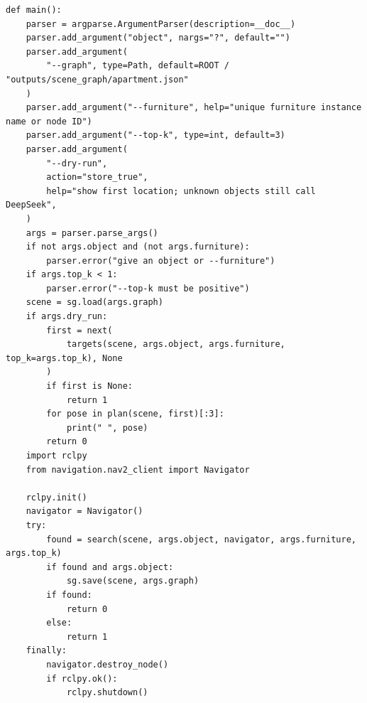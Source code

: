 \documentclass[11pt,a4paper]{book}
\begin{document}
\begin{lstlisting}[firstnumber=110]
def main():
    parser = argparse.ArgumentParser(description=__doc__)
    parser.add_argument("object", nargs="?", default="")
    parser.add_argument(
        "--graph", type=Path, default=ROOT / "outputs/scene_graph/apartment.json"
    )
    parser.add_argument("--furniture", help="unique furniture instance name or node ID")
    parser.add_argument("--top-k", type=int, default=3)
    parser.add_argument(
        "--dry-run",
        action="store_true",
        help="show first location; unknown objects still call DeepSeek",
    )
    args = parser.parse_args()
    if not args.object and (not args.furniture):
        parser.error("give an object or --furniture")
    if args.top_k < 1:
        parser.error("--top-k must be positive")
    scene = sg.load(args.graph)
    if args.dry_run:
        first = next(
            targets(scene, args.object, args.furniture, top_k=args.top_k), None
        )
        if first is None:
            return 1
        for pose in plan(scene, first)[:3]:
            print(" ", pose)
        return 0
    import rclpy
    from navigation.nav2_client import Navigator

    rclpy.init()
    navigator = Navigator()
    try:
        found = search(scene, args.object, navigator, args.furniture, args.top_k)
        if found and args.object:
            sg.save(scene, args.graph)
        if found:
            return 0
        else:
            return 1
    finally:
        navigator.destroy_node()
        if rclpy.ok():
            rclpy.shutdown()


\end{lstlisting}
\end{document}
